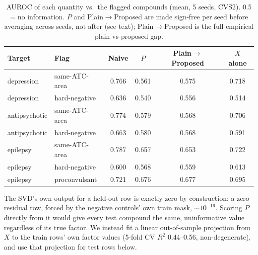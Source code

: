 \documentclass{llncs}
\begin{document}
\begin{table}[t]
\centering
\scriptsize
\caption{AUROC of each quantity vs.\ the flagged compounds (mean, 5 seeds, CVS2). 0.5 = no information. $P$ and Plain$\to$Proposed are made sign-free per seed before averaging across seeds, not after (see text); Plain$\to$Proposed is the full empirical plain-vs-proposed gap.}
\label{tab:alignment}
\begin{tabular}{llcccc}
\toprule
Target & Flag & Naive & $P$ & Plain$\to$Proposed & $X$ alone \\
\midrule
depression & same-ATC-area & 0.766 & 0.561 & 0.575 & 0.718 \\
depression & hard-negative & 0.636 & 0.540 & 0.556 & 0.514 \\
antipsychotic & same-ATC-area & 0.774 & 0.579 & 0.568 & 0.706 \\
antipsychotic & hard-negative & 0.663 & 0.580 & 0.568 & 0.591 \\
epilepsy & same-ATC-area & 0.787 & 0.657 & 0.653 & 0.722 \\
epilepsy & hard-negative & 0.600 & 0.568 & 0.559 & 0.613 \\
epilepsy & proconvulsant & 0.721 & 0.676 & 0.677 & 0.695 \\
\bottomrule
\end{tabular}
\end{table}

\label{sec:oos-fix}
The SVD's own output for a held-out row is exactly zero by construction: a zero residual row, forced by the negative controls' own train mask, $\sim10^{-16}$. Scoring $P$ directly from it would give every test compound the same, uninformative value regardless of its true factor. We instead fit a linear out-of-sample projection from $X$ to the train rows' own factor values (5-fold CV $R^2$ 0.44--0.56, non-degenerate), and use that projection for test rows below.
\end{document}
